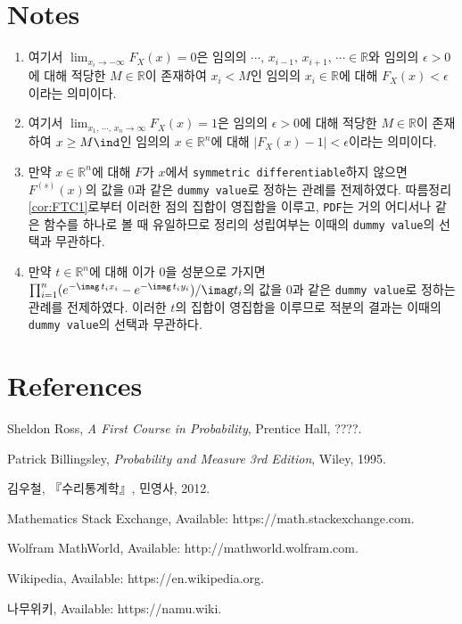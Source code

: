\section*{Notes}
\footnotesize
\begin{enumerate}[label = \textsf{\textbf{\arabic*}}]
    \item 여기서 $\lim_{x_i\to-\infty}F_X(x)=0$은 임의의 $\cdots,\,x_{i-1},\,x_{i+1},\,\cdots\in\mathbb{R}$와 임의의 $\epsilon>0$에 대해 적당한 $M\in\mathbb{R}$이 존재하여 $x_i<M$인 임의의 $x_i\in\mathbb{R}$에 대해 $F_X(x)<\epsilon$이라는 의미이다.
    \item 여기서 $\lim_{x_1,\,\cdots,\,x_n\to\infty}F_X(x)=1$은 임의의 $\epsilon>0$에 대해 적당한 $M\in\mathbb{R}$이 존재하여 $x\geq M\ind$인 임의의 $x\in\mathbb{R}^n$에 대해 $|F_X(x)-1|<\epsilon$이라는 의미이다.
    \item 만약 $x\in\mathbb{R}^n$에 대해 $F$가 $x$에서 \texttt{symmetric differentiable}하지 않으면 $F^{(s)}(x)$의 값을 $0$과 같은 \texttt{dummy value}로 정하는 관례를 전제하였다. 따름정리 \ref{cor:FTC1}로부터 이러한 점의 집합이 영집합을 이루고, \texttt{PDF}는 거의 어디서나 같은 함수를 하나로 볼 때 유일하므로 정리의 성립여부는 이때의 \texttt{dummy value}의 선택과 무관하다.
    \item 만약 $t\in\mathbb{R}^n$에 대해 이가 $0$을 성분으로 가지면 $\prod_{i=1}^n(e^{-\imag\,t_ix_i}-e^{-\imag\,t_iy_i})/\imag t_i$의 값을 $0$과 같은 \texttt{dummy value}로 정하는 관례를 전제하였다. 이러한 $t$의 집합이 영집합을 이루므로 적분의 결과는 이때의 \texttt{dummy value}의 선택과 무관하다.
\end{enumerate}

\section*{References}
\normalsize\ttfamily
\begin{enumerate}[label = {[\arabic*]}]
    \item Sheldon Ross, \textit{A First Course in Probability}, Prentice Hall, ????.
    \item Patrick Billingsley, \textit{Probability and Measure 3rd Edition}, Wiley, 1995.
    \item \textrm{김우철}, \textrm{『수리통계학』}, \textrm{민영사}, 2012.
    \item Mathematics Stack Exchange, Available: https://math.stackexchange.com.
    \item Wolfram MathWorld, Available: http://mathworld.wolfram.com.
    \item Wikipedia, Available: https://en.wikipedia.org.
    \item \textrm{나무위키}, Available: https://namu.wiki.
\end{enumerate}
\rmfamily